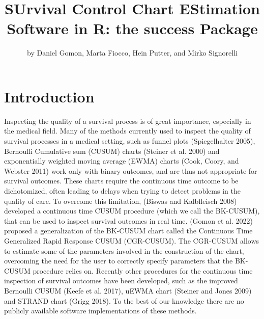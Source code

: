 \title{SUrvival Control Chart EStimation Software in R: the success Package}


\author{by Daniel Gomon, Marta Fiocco, Hein Putter, and Mirko Signorelli}

\maketitle


\hypertarget{introduction}{%
\section{Introduction}\label{introduction}}

Inspecting the quality of a survival process is of great importance, especially in the medical field. Many of the methods currently used to inspect the quality of survival processes in a medical setting, such as funnel plots (Spiegelhalter 2005), Bernoulli Cumulative sum (CUSUM) charts (Steiner et al. 2000) and exponentially weighted moving average (EWMA) charts (Cook, Coory, and Webster 2011) work only with binary outcomes, and are thus not appropriate for survival outcomes. These charts require the continuous time outcome to be dichotomized, often leading to delays when trying to detect problems in the quality of care. To overcome this limitation, (Biswas and Kalbfleisch 2008) developed a continuous time CUSUM procedure (which we call the BK-CUSUM), that can be used to inspect survival outcomes in real time. (Gomon et al. 2022) proposed a generalization of the BK-CUSUM chart called the Continuous Time Generalized Rapid Response CUSUM (CGR-CUSUM). The CGR-CUSUM allows to estimate some of the parameters involved in the construction of the chart, overcoming the need for the user to correctly specify parameters that the BK-CUSUM procedure relies on. Recently other procedures for the continuous time inspection of survival outcomes have been developed, such as the improved Bernoulli CUSUM (Keefe et al. 2017), uEWMA chart (Steiner and Jones 2009) and STRAND chart (Grigg 2018). To the best of our knowledge there are no publicly available software implementations of these methods.

